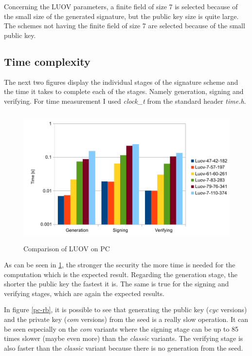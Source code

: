 \documentclass[thesis=M,english]{FITthesis}[2019/12/23]
\begin{document}
\bigskip
\noindent
Concerning the LUOV parameters, a finite field of size 7 is selected because of the small size of the generated signature, but the public key size is quite large. The schemes not having the finite field of size 7 are selected because of the small public key.

\subsection{Time complexity} \label{time-complex-pc}
The next two figures display the individual stages of the signature scheme and the time it takes to complete each of the stages. Namely generation, signing and verifying. For time measurement I used \textit{clock\_t} from the standard header \textit{time.h}.
\begin{figure}[H]
\centering
\includegraphics[width=13cm,height=7cm]{images/pc-luov.pdf}
\caption{Comparison of LUOV on PC}
\label{pc-luov}
\end{figure}

\noindent
As can be seen in \ref{pc-luov}, the stronger the security the more time is needed for the computation which is the expected result. Regarding the generation stage, the shorter the public key the fastest it is. The same is true for the signing and verifying stages, which are again the expected results. 

\bigskip
\noindent
In figure \ref{pc-rb}, it is possible to see that generating the public key (\textit{cyc} versions) and the private key (\textit{com} versions) from the seed is a really slow operation. It can be seen especially on the \textit{com} variants where the signing stage can be up to 85 times slower (maybe even more) than the \textit{classic} variants. The verifying stage is also faster than the \textit{classic} variant because there is no generation from the seed. 
\end{document}
